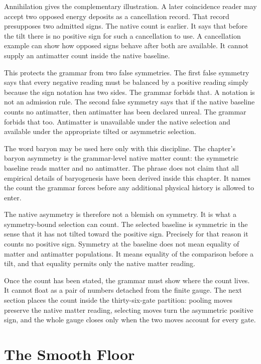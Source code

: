 Annihilation gives the complementary illustration. A later coincidence
reader may accept two opposed energy deposits as a cancellation record. That
record presupposes two admitted signs. The native count is earlier. It says
that before the tilt there is no positive sign for such a cancellation to
use. A cancellation example can show how opposed signs behave after both are
available. It cannot supply an antimatter count inside the native baseline.

This protects the grammar from two false symmetries. The first false
symmetry says that every negative reading must be balanced by a positive
reading simply because the sign notation has two sides. The grammar forbids
that. A notation is not an admission rule. The second false symmetry says
that if the native baseline counts no antimatter, then antimatter has been
declared unreal. The grammar forbids that too. Antimatter is unavailable
under the native selection and available under the appropriate tilted or
asymmetric selection.

The word baryon may be used here only with this discipline. The chapter's
baryon asymmetry is the grammar-level native matter count: the symmetric
baseline reads matter and no antimatter. The phrase does not claim that all
empirical details of baryogenesis have been derived inside this chapter. It
names the count the grammar forces before any additional physical history is
allowed to enter.

The native asymmetry is therefore not a blemish on symmetry. It is what a
symmetry-bound selection can count. The selected baseline is symmetric in
the sense that it has not tilted toward the positive sign. Precisely for
that reason it counts no positive sign. Symmetry at the baseline does not
mean equality of matter and antimatter populations. It means equality of the
comparison before a tilt, and that equality permits only the native matter
reading.

Once the count has been stated, the grammar must show where the count lives.
It cannot float as a pair of numbers detached from the finite gauge. The
next section places the count inside the thirty-six-gate partition: pooling
moves preserve the native matter reading, selecting moves turn the
asymmetric positive sign, and the whole gauge closes only when the two moves
account for every gate.

\section{The Smooth Floor}

